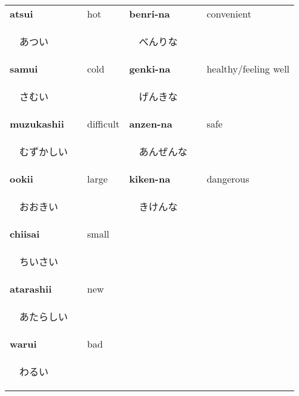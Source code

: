 \documentclass[11pt]{article} %
\begin{document}
\begin{center}
\begin{tabular}{l l | l l}
\textbf{atsui} & hot 				& \textbf{benri-na} & convenient\\
\begin{CJK}{UTF8}{min}　あつい　\end{CJK} && \begin{CJK}{UTF8}{min}　べんりな　\end{CJK}\\
\textbf{samui} & cold 				& \textbf{genki-na} & healthy/feeling well\\
\begin{CJK}{UTF8}{min}　さむい　\end{CJK} && \begin{CJK}{UTF8}{min}　げんきな　\end{CJK}\\
\textbf{muzukashii} & difficult 	& \textbf{anzen-na}	& safe\\
\begin{CJK}{UTF8}{min}　むずかしい　\end{CJK} && \begin{CJK}{UTF8}{min}　あんぜんな　\end{CJK}\\
\textbf{ookii} & large 				& \textbf{kiken-na} & dangerous\\
\begin{CJK}{UTF8}{min}　おおきい　\end{CJK} && \begin{CJK}{UTF8}{min}　きけんな　\end{CJK}\\
\textbf{chiisai} & small \\
\begin{CJK}{UTF8}{min}　ちいさい\end{CJK}&&&\\
\textbf{atarashii}	& new \\
\begin{CJK}{UTF8}{min}　あたらしい　\end{CJK}&&&\\
\textbf{warui} & bad \\
\begin{CJK}{UTF8}{min}　わるい　\end{CJK}&&&\\
\end{tabular}
\end{center}
\end{document}
